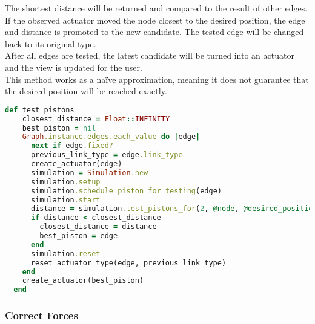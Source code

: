 The shortest distance will be returned and compared to the result of other edges. If the observed actuator moved the node closest to the desired position, the edge and distance is promoted to the new candidate. The tested edge will be changed back to its original type.\\
After all edges are tested, the latest candidate will be turned into an actuator and the view is updated for the user.\\
This method works as a naïve approximation, meaning it does not guarantee that the desired position will be reached exactly.

\begin{lstlisting}[language=Ruby, label={lst:test_piston}, caption=The test\_piston method changes each edge into an actuator\, tests its movement and determines how close it brings a selected node to a desired position.]
  def test_pistons
    closest_distance = Float::INFINITY
    best_piston = nil
    Graph.instance.edges.each_value do |edge|
      next if edge.fixed?
      previous_link_type = edge.link_type
      create_actuator(edge)
      simulation = Simulation.new
      simulation.setup
      simulation.schedule_piston_for_testing(edge)
      simulation.start
      distance = simulation.test_pistons_for(2, @node, @desired_position)
      if distance < closest_distance
        closest_distance = distance
        best_piston = edge
      end
      simulation.reset
      reset_actuator_type(edge, previous_link_type)
    end
    create_actuator(best_piston)
  end
\end{lstlisting}

\subsubsection{Correct Forces}

